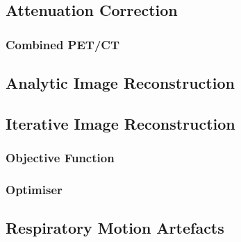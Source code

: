         \subsection{Attenuation Correction} \label{attenuation_correction}
            \blindtext
            
                \subsubsection{Combined PET/CT} \label{combined_pet_ct}
                    \blindtext
    
        \blindtext
        
        \subsection{Analytic Image Reconstruction} \label{analytic_image_reconstruction}
            \blindtext
        
        \subsection{Iterative Image Reconstruction} \label{iterative_image_reconstruction}
            \blindtext
            
            \subsubsection{Objective Function} \label{iterative_image_reconstruction_objective_function}
                \blindtext
                
            \subsubsection{Optimiser} \label{iterative_image_reconstruction_optimiser}
                \blindtext
    
        \blindtext
        
        \subsection{Respiratory Motion Artefacts} \label{respiratory_motion_artefacts}
            \blindtext
            
